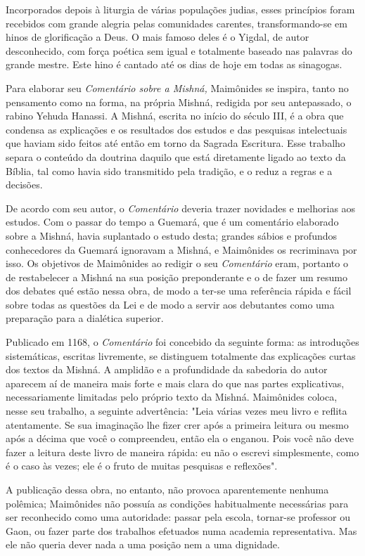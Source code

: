 Incorporados depois à liturgia de várias populações judias, esses
prin­cípios foram recebidos com grande alegria pelas comunidades
carentes, trans­formando-se em hinos de glorificação a Deus. O mais
famoso deles é o Yigdal, de autor desconhecido, com força poética sem
igual e totalmente baseado nas palavras do grande mestre. Este hino é
cantado até os dias de hoje em todas as sinagogas.

Para elaborar seu \emph{Comentário sobre a Mishná,} Maimônides se
inspi­ra, tanto no pensamento como na forma, na própria Mishná, redigida
por seu antepassado, o rabino Yehuda Hanassi. A Mishná, escrita no início do
sécu­lo III, é a obra que condensa as explicações e os resultados dos
estudos e das pesquisas intelectuais que haviam sido feitos até então em
torno da Sagrada Es­critura. Esse trabalho separa o conteúdo da doutrina
daquilo que está direta­mente ligado ao texto da Bíblia, tal como havia
sido transmitido pela tradição, e o reduz a regras e a decisões.

De acordo com seu autor, o \emph{Comentário} deveria trazer novidades e
melhorias aos estudos. Com o passar do
tempo a Guemará, que é um comen­tário elaborado sobre a Mishná, havia
suplantado o estudo desta; grandes sá­bios e profundos conhecedores da
Guemará ignoravam a Mishná, e Maimôni­des os recriminava por isso. Os
objetivos de Maimônides ao redigir o seu \emph{Co­mentário} eram,
portanto o de restabelecer a Mishná na sua posição preponde­rante e o de
fazer um resumo dos debates qué estão nessa obra, de modo a ter-se uma
referência rápida e fácil sobre todas as questões da Lei e de modo a
servir aos debutantes como uma preparação para a dialética superior.

Publicado em 1168, o \emph{Comentário} foi concebido da seguinte for­ma:
as introduções sistemáticas, escritas livremente, se distinguem
totalmente das explicações curtas dos textos da Mishná. A amplidão e a
profundidade da sabedoria do autor aparecem aí de maneira mais forte e
mais clara do que nas partes explicativas, necessariamente limitadas
pelo próprio texto da Mishná. Mai­mônides coloca, nesse seu trabalho, a
seguinte advertência: "Leia várias vezes meu livro e reflita
atentamente. Se sua imaginação lhe fizer crer após a primeira leitura ou
mesmo após a décima que você o compreendeu, então ela o enga­nou. Pois
você não deve fazer a leitura deste livro de maneira rápida: eu não o
escrevi simplesmente, como é o caso às vezes; ele é o fruto de muitas
pesqui­sas e reflexões".

A publicação dessa obra, no entanto, não provoca aparentemente nenhuma
polêmica; Maimônides não possuía as condições habitualmente ne­cessárias
para ser reconhecido como uma autoridade: passar pela escola, tornar-se
professor ou Gaon, ou fazer parte dos trabalhos efetuados numa academia
re­presentativa. Mas ele não queria dever nada a uma posição nem a uma
dignidade.

